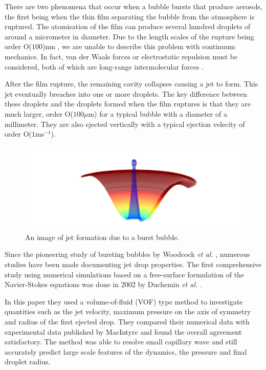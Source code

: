 There are two phenomena that occur when a bubble bursts that produce aerosols, the first being when the thin film separating the bubble from the atmosphere is ruptured. The atomisation of the film can produce several hundred droplets of around a micrometer in diameter. Due to the length scales of the rupture being order O($100$)nm \cite{boulton1993gas}, we are unable to describe this problem with continuum mechanics. In fact, van der Waals forces or electrostatic repulsion must be considered, both of which are long-range intermolecular forces \cite{boulton1993gas}. 

After the film rupture, the remaining cavity collapses causing a jet to form. This jet eventually breaches into one or more droplets. The key difference between these droplets and the droplets formed when the film ruptures is that they are much larger, order O($100 \mu$m) for a typical bubble with a diameter of a millimeter. They are also ejected vertically with a typical ejection velecity of order O($1$ms$^{-1}$).
\begin{figure}[H]
    \centering
    \includegraphics[width=0.75\linewidth]{WriteUp/images/droplet release 3D.png}
    \caption{An image of jet formation due to a burst bubble.}
    \label{fig:1}
\end{figure}

Since the pioneering study of bursting bubbles by Woodcock \textit{et al.} \cite{woodcock1953giant}, numerous studies have been made documenting jet drop properties. The first comprehensive study using numerical simulations based on a free-surface formulation of the Navier-Stokes equations was done in 2002 by Duchemin \textit{et al.} \cite{duchemin2002jet
}.

In this paper they used a volume-of-fluid (VOF) type method to investigate quantities such as the jet velocity, maximum pressure on the axis of symmetry and radius of the first ejected drop. They compared their numerical data with experimental data published by MacIntyre \cite{macintyre1972flow} and found the overall agreement satisfactory. The method was able to resolve small capillary wave and still accurately predict large scale features of the dynamics, the pressure and final droplet radius.

